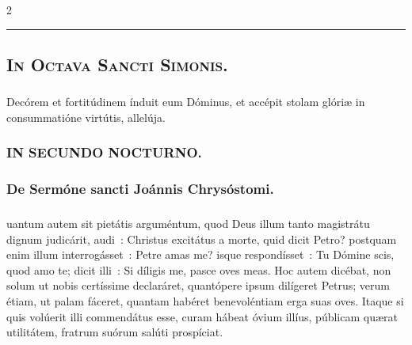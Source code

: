 \documentclass[9pt,twoside]{extarticle}
\begin{document}
\begin{multicols}{2}
{\begin{center}\textcolor{red}{\rule{\linewidth}{0.5pt}} \end{center}

\subsubsection*{\center {}}
\subsection*{\center \textsc{In Octava Sancti Simonis.}}
\subsubsection*{\center {}}
\begin{tightlist}{}
\item {}
\item {} Decórem et fortitúdinem índuit eum Dóminus, et accépit stolam glóriæ in consummatióne virtútis, allelúja.
\item {}
\item {}
\end{tightlist}

\subsubsection*{\center \textsc{IN SECUNDO NOCTURNO.}}
\subsubsection*{\center De Sermóne sancti Joánnis Chrysóstomi.}
\subsubsection*{\center {}}
uantum autem sit pietátis arguméntum, quod Deus illum tanto magistrátu dignum judicárit, audi~: Christus excitátus a morte, quid dicit Petro? postquam enim illum interrogásset~: Petre amas me? isque respondísset~: Tu Dómine scis, quod amo te; dicit illi~: Si díligis me, pasce oves meas. Hoc autem dicébat, non solum ut nobis certíssime declaráret, quantópere ipsum dilígeret Petrus; verum étiam, ut palam fáceret, quantam habéret benevoléntiam erga suas oves. Itaque si quis volúerit illi commendátus esse, curam hábeat óvium illíus, públicam quærat utilitátem, fratrum suórum salúti prospíciat.

}
\end{multicols}
\end{document}

